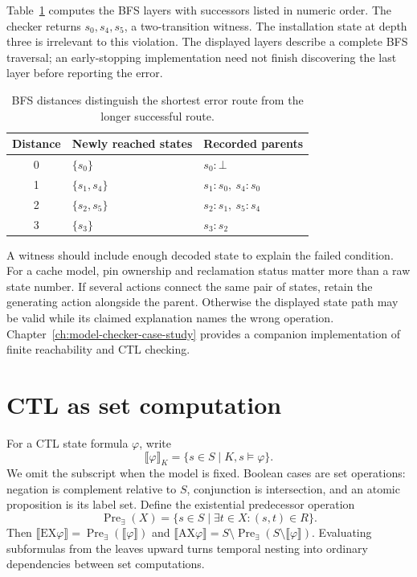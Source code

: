 Table~\ref{tab:ch46-bfs-levels} computes the BFS layers with successors listed in numeric order.
The checker returns $s_0,s_4,s_5$, a two-transition witness.
The installation state at depth three is irrelevant to this violation.
The displayed layers describe a complete BFS traversal; an early-stopping implementation need not finish discovering the last layer before reporting the error.

\begin{table}[tbp]
\centering
\caption{BFS distances distinguish the shortest error route from the longer successful route.}
\label{tab:ch46-bfs-levels}
\begin{tabular}{cll}
\toprule
Distance & Newly reached states & Recorded parents \\
\midrule
0 & $\{s_0\}$ & $s_0:\bot$ \\
1 & $\{s_1,s_4\}$ & $s_1:s_0,\ s_4:s_0$ \\
2 & $\{s_2,s_5\}$ & $s_2:s_1,\ s_5:s_4$ \\
3 & $\{s_3\}$ & $s_3:s_2$ \\
\bottomrule
\end{tabular}
\end{table}

A witness should include enough decoded state to explain the failed condition.
For a cache model, pin ownership and reclamation status matter more than a raw state number.
If several actions connect the same pair of states, retain the generating action alongside the parent.
Otherwise the displayed state path may be valid while its claimed explanation names the wrong operation.
Chapter~\ref{ch:model-checker-case-study} provides a companion implementation of finite reachability and CTL checking.

\section{CTL as set computation}
\label{sec:ch46-ctl-sets}

For a CTL state formula $\varphi$, write
\[
 \llbracket\varphi\rrbracket_K=\{s\in S\mid K,s\models\varphi\}.
\]
We omit the subscript when the model is fixed.
Boolean cases are set operations: negation is complement relative to $S$, conjunction is intersection, and an atomic proposition is its label set.
Define the existential predecessor operation
\[
 \operatorname{Pre}_{\exists}(X)=\{s\in S\mid\exists t\in X:(s,t)\in R\}.
\]
Then $\llbracket\mathrm{EX}\varphi\rrbracket=\operatorname{Pre}_{\exists}(\llbracket\varphi\rrbracket)$ and $\llbracket\mathrm{AX}\varphi\rrbracket=S\setminus\operatorname{Pre}_{\exists}(S\setminus\llbracket\varphi\rrbracket)$.
Evaluating subformulas from the leaves upward turns temporal nesting into ordinary dependencies between set computations.

